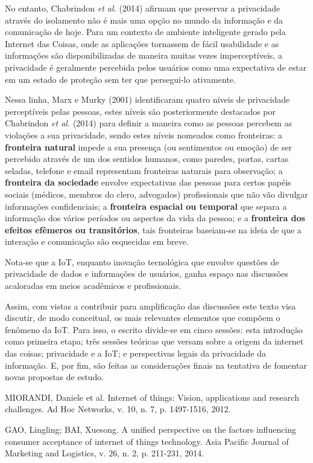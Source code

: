 No entanto, Chabrindon \textit{et al.} (2014) afirmam que preservar a privacidade através do isolamento não é mais uma opção no mundo da informação e da comunicação de hoje. Para um contexto de ambiente inteligente gerado pela Internet das Coisas, onde as aplicações tornassem de fácil usabilidade e as informações são disponibilizadas de maneira muitas vezes imperceptíveis, a privacidade é geralmente percebida pelos usuários como uma expectativa de estar em um estado de proteção sem ter que persegui-lo ativamente.

Nessa linha, Marx e Murky (2001) identificaram quatro níveis de privacidade perceptíveis pelas pessoas, estes níveis são posteriormente destacados por Chabrindon \textit{et al.} (2014) para definir a maneira como as pessoas percebem as violações a sua privacidade, sendo estes níveis nomeados como fronteiras: a \textbf{fronteira natural} impede a sua presença (ou sentimentos ou emoção) de ser percebido através de um dos sentidos humanos, como paredes, portas, cartas seladas, telefone e email representam fronteiras naturais para observação; a \textbf{fronteira da sociedade} envolve expectativas das pessoas para certos papéis sociais (médicos, membros do clero, advogados) profissionais que não vão divulgar informações confidenciais; a \textbf{fronteira espacial ou temporal} que separa a informação dos vários períodos ou aspectos da vida da pessoa; e a \textbf{fronteira dos efeitos efêmeros ou transitórios}, tais fronteiras baseiam-se na ideia de que a interação e comunicação são esquecidas em breve.

Nota-se que a IoT, enquanto inovação tecnológica que envolve questões de privacidade de dados e informações de usuários, ganha espaço nas discussões acaloradas em meios acadêmicos e profissionais.

Assim, com vistas a contribuir para amplificação das discussões este texto visa discutir, de modo conceitual, os mais relevantes elementos que compõem o fenômeno da IoT. Para isso, o escrito divide-se em cinco sessões: esta introdução como primeira etapa; três sessões teóricas que versam sobre a origem da internet das coisas; privacidade e a IoT; e perspectivas legais da privacidade da informação. E, por fim, são feitas as considerações finais na tentativa de fomentar novas propostas de estudo.	

MIORANDI, Daniele et al. Internet of things: Vision, applications and research challenges. Ad Hoc Networks,
v. 10, n. 7, p. 1497-1516, 2012.

GAO, Lingling; BAI, Xuesong. A unified perspective on the factors influencing consumer acceptance of internet
of things technology. Asia Pacific Journal of Marketing and Logistics, v. 26, n. 2, p. 211-231, 2014.

